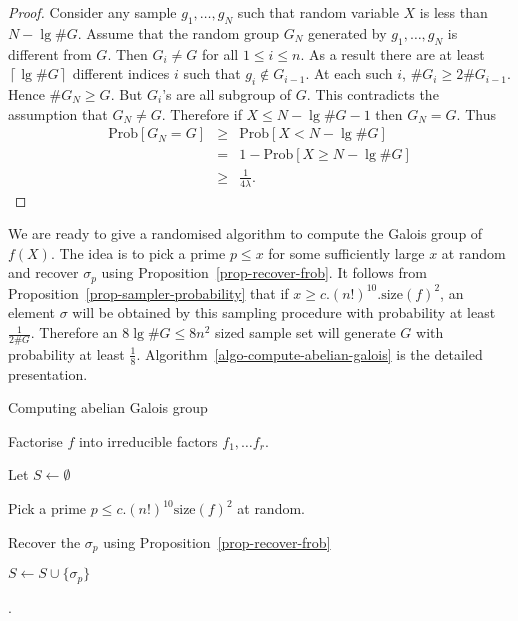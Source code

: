 \documentclass[11pt]{madras}%
\theoremstyle{remark}
\newcommand{\size}[1]{{\ensuremath{\mathrm{size}\left(#1\right)}}}
\begin{document}
\begin{proof}
Consider any sample $g_1,\ldots,g_N$ such that random variable $X$ is
less than $N - \lg{\# G}$. Assume that the random group $G_N$
generated by $g_1,\ldots,g_N$ is different from $G$. Then $G_i \neq G$
for all $ 1\leq i \leq n$. As a result there are at least
$\left\lceil\lg{\# G}\right\rceil$ different indices $i$ such that
$g_i \not\in G_{i-1}$. At each such $i$, $\# G_{i} \geq 2 \# G_{i-1}$.
Hence $\# G_N \geq G$. But $G_i$'s are all subgroup of $G$.  This
contradicts the assumption that $G_N \neq G$.  Therefore if $X \leq N
- \lg{\# G } -1$ then $G_N = G$. Thus
\begin{eqnarray*}
  \mathrm{Prob}[G_N = G] &\geq& \mathrm{Prob}[X < N - \lg{\# G}] \\
  &=& 1 - \mathrm{Prob}[X \geq N - \lg{\# G}] \\
  &\geq & \frac{1}{4\lambda}.
\end{eqnarray*}



\end{proof}

We are ready to give a randomised algorithm to compute the Galois
group of $f(X)$.  The idea is to pick a prime $p \leq x$ for some
sufficiently large $x$ at random and recover $\sigma_p$ using
Proposition~\ref{prop-recover-frob}. It follows from
Proposition~\ref{prop-sampler-probability} that if $x \geq c.
(n!)^{10}. \size{f}^2$, an element $\sigma$ will be obtained by this
sampling procedure with probability at least $\frac{1}{2\# G}$.
Therefore an $8\lg{\# G} \leq 8n^2$ sized sample set will generate $G$
with probability at least $\frac{1}{8}$.
Algorithm~\ref{algo-compute-abelian-galois} is the detailed
presentation.

\begin{algorithm}
  \caption{Computing abelian Galois
    group}\label{algo-compute-abelian-galois}%


  Factorise $f$ into irreducible factors $f_1,\ldots f_r$.

  Let $S \leftarrow \emptyset$

  {

    Pick a prime $p \leq c. (n!)^{10} \size{f}^2$ at random.

    Recover the $\sigma_p$ using Proposition~\ref{prop-recover-frob}

    $S \leftarrow S \cup \{ \sigma_p \}$

  }
    
  .

\end{algorithm}
\end{document}
